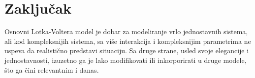 \documentclass[a4paper]{article}
\begin{document}
\section{Zaključak}
\label{sec:zakljucak}

Osnovni Lotka-Voltera model je dobar za modeliranje vrlo jednostavnih sistema,
ali kod kompleksnijih sistema, sa više interakcija i kompleksnijim parametrima ne uspeva
da realistično predstavi situaciju. Sa druge strane, usled svoje elegancije i jednostavnosti,
izuzetno ga je lako modifikovati ili inkorporirati u druge modele, što ga čini relevantnim i danas.
\end{document}
